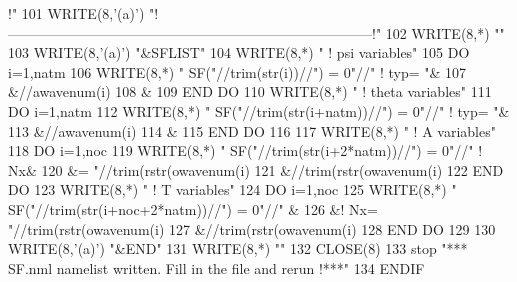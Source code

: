 \begin{DoxyCode}
{                 !"}
101        \textcolor{keyword}{WRITE}(8,\textcolor{stringliteral}{'(a)'}) \textcolor{stringliteral}{"!------------------------------------------------------------------------------!"}
102        \textcolor{keyword}{WRITE}(8,*) \textcolor{stringliteral}{""}
103        \textcolor{keyword}{WRITE}(8,\textcolor{stringliteral}{'(a)'}) \textcolor{stringliteral}{"&SFLIST"}
104        \textcolor{keyword}{WRITE}(8,*) \textcolor{stringliteral}{" ! psi variables"}
105        \textcolor{keywordflow}{DO} i=1,natm
106           \textcolor{keyword}{WRITE}(8,*) \textcolor{stringliteral}{" SF("}//trim(str(i))//\textcolor{stringliteral}{") = 0"}//\textcolor{stringliteral}{"   ! typ= "}&
107                &//awavenum(i)%
108                &%
109 \textcolor{keywordflow}{       END DO}
110        \textcolor{keyword}{WRITE}(8,*) \textcolor{stringliteral}{" ! theta variables"}
111        \textcolor{keywordflow}{DO} i=1,natm
112           \textcolor{keyword}{WRITE}(8,*) \textcolor{stringliteral}{" SF("}//trim(str(i+natm))//\textcolor{stringliteral}{") = 0"}//\textcolor{stringliteral}{"   ! typ= "}&
113                &//awavenum(i)%
114                &%
115 \textcolor{keywordflow}{       END DO}
116 
117        \textcolor{keyword}{WRITE}(8,*) \textcolor{stringliteral}{" ! A variables"}
118        \textcolor{keywordflow}{DO} i=1,noc
119           \textcolor{keyword}{WRITE}(8,*) \textcolor{stringliteral}{" SF("}//trim(str(i+2*natm))//\textcolor{stringliteral}{") = 0"}//\textcolor{stringliteral}{"   ! Nx&}
120 \textcolor{stringliteral}{}\textcolor{stringliteral}{               &= "}//trim(rstr(owavenum(i)%
121                &//trim(rstr(owavenum(i)%
122 \textcolor{keywordflow}{       END DO}
123        \textcolor{keyword}{WRITE}(8,*) \textcolor{stringliteral}{" ! T variables"}
124        \textcolor{keywordflow}{DO} i=1,noc
125           \textcolor{keyword}{WRITE}(8,*) \textcolor{stringliteral}{" SF("}//trim(str(i+noc+2*natm))//\textcolor{stringliteral}{") = 0"}//\textcolor{stringliteral}{"   &}
126 \textcolor{stringliteral}{}\textcolor{stringliteral}{               &! Nx= "}//trim(rstr(owavenum(i)%
127                &//trim(rstr(owavenum(i)%
128 \textcolor{keywordflow}{       END DO}
129 
130        \textcolor{keyword}{WRITE}(8,\textcolor{stringliteral}{'(a)'}) \textcolor{stringliteral}{"&END"}
131        \textcolor{keyword}{WRITE}(8,*) \textcolor{stringliteral}{""}
132        \textcolor{keyword}{CLOSE}(8)
133        stop \textcolor{stringliteral}{"*** SF.nml namelist written. Fill in the file and rerun !***"}
134 \textcolor{keywordflow}{    ENDIF}
\end{DoxyCode}


